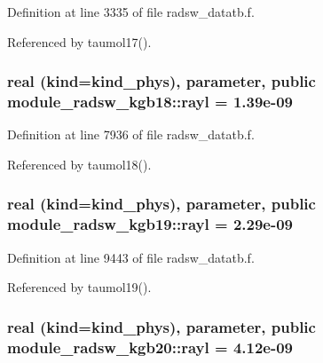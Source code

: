 Definition at line 3335 of file radsw\+\_\+datatb.\+f.



Referenced by taumol17().

\subsubsection[{\texorpdfstring{rayl}{rayl}}]{\setlength{\rightskip}{0pt plus 5cm}real (kind=kind\+\_\+phys), parameter, public module\+\_\+radsw\+\_\+kgb18\+::rayl = 1.\+39e-\/09}\hypertarget{group__module__radsw__main_ga9cd3f07e259e4982c7ef2889fee6cccb}{}\label{group__module__radsw__main_ga9cd3f07e259e4982c7ef2889fee6cccb}


Definition at line 7936 of file radsw\+\_\+datatb.\+f.



Referenced by taumol18().

\subsubsection[{\texorpdfstring{rayl}{rayl}}]{\setlength{\rightskip}{0pt plus 5cm}real (kind=kind\+\_\+phys), parameter, public module\+\_\+radsw\+\_\+kgb19\+::rayl = 2.\+29e-\/09}\hypertarget{group__module__radsw__main_gac79ad61e8d246d6075664df4201373d7}{}\label{group__module__radsw__main_gac79ad61e8d246d6075664df4201373d7}


Definition at line 9443 of file radsw\+\_\+datatb.\+f.



Referenced by taumol19().

\subsubsection[{\texorpdfstring{rayl}{rayl}}]{\setlength{\rightskip}{0pt plus 5cm}real (kind=kind\+\_\+phys), parameter, public module\+\_\+radsw\+\_\+kgb20\+::rayl = 4.\+12e-\/09}\hypertarget{group__module__radsw__main_ga6a00db6ce81c299d44ef5eadc1fe3b5b}{}\label{group__module__radsw__main_ga6a00db6ce81c299d44ef5eadc1fe3b5b}


